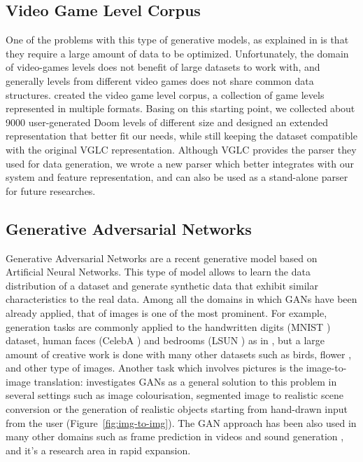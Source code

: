 \subsection{Video Game Level Corpus}
One of the problems with this type of generative models, as explained in \cite{PCGML} is that they require a large amount of data to be optimized. Unfortunately, the domain of video-games levels does not benefit of large datasets to work with, and generally levels from different video games does not share common data structures. \citeauthor{VGLC} created the video game level corpus, a collection of game levels represented in multiple formats. Basing on this starting point, we collected about 9000 user-generated Doom levels of different size and designed an extended representation that better fit our needs, while still keeping the dataset compatible with the original VGLC representation. Although VGLC provides the parser they used for data generation, we wrote a new parser which better integrates with our system and feature representation, and can also be used as a stand-alone parser for future researches.

\subsection{Generative Adversarial Networks}
Generative Adversarial Networks are a recent generative model based on Artificial Neural Networks. This type of model allows to learn the data distribution of a dataset and generate synthetic data that exhibit similar characteristics to the real data. Among all the domains in which GANs have been already applied, that of images is one of the most prominent. For example, generation tasks are commonly applied to the handwritten digits (MNIST \cite{dataset:MNIST}) dataset, human faces (CelebA \cite{dataset:celebA}) and bedrooms (LSUN \cite{dataset:LSUN}) as in \cite{gan:dcgan}, but a large amount of creative work is done with many other datasets such as birds, flower \cite{gan:birds}, and other type of images. Another task which involves pictures is the image-to-image translation: \citeauthor{image-to-image} investigates GANs as a general solution to this problem in several settings \cite{image-to-image} such as image colourisation, segmented image to realistic scene conversion or  the generation of realistic objects starting from hand-drawn input from the user (Figure~\ref{fig:img-to-img}). The GAN approach has been also used in many other domains such as frame prediction in videos \cite{gan:frameprediction} and sound generation \cite{gan:sound}, and it's a research area in rapid expansion.

